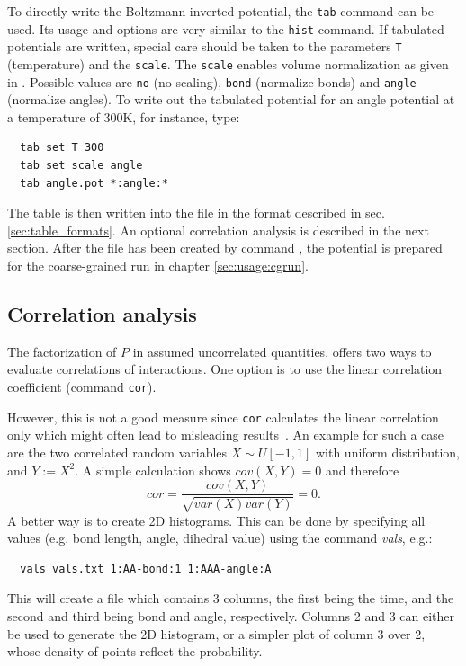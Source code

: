 To directly write the Boltzmann-inverted potential, the \texttt{tab} command can be used. Its usage and options are very similar to the \texttt{hist} command. If tabulated potentials are written, special care should be taken to the parameters \texttt{T} (temperature) and the \texttt{scale}. The \texttt{scale} enables volume normalization as given in . Possible values are \texttt{no} (no scaling), \texttt{bond} (normalize bonds) and \texttt{angle} (normalize angles). To write out the tabulated potential for an angle potential at a temperature of 300K, for instance, type:
\begin{verbatim}
  tab set T 300
  tab set scale angle
  tab angle.pot *:angle:*
\end{verbatim}
The table is then written into the file  in the format described in sec. \ref{sec:table_formats}. An optional correlation analysis is described in the next section. After the file has been created by command , the potential is prepared for the coarse-grained run in chapter \ref{sec:usage:cgrun}.

\subsection{Correlation analysis}
The factorization of $P$ in  assumed uncorrelated quantities.  offers two ways to evaluate correlations of interactions. One option is to use the linear correlation coefficient (command \texttt{cor}).

However, this is not a good measure since \texttt{cor} calculates the linear correlation only which might often lead to misleading results~\cite{Ruehle:2009.a}. An example for such a case are the two correlated random variables $X \sim U[-1,1]$ with uniform distribution, and $Y:=X^2$. A simple calculation shows $cov(X,Y)=0$ and therefore
$$cor=\frac{cov(X,Y)}{\sqrt{var(X)var(Y)}}=0.$$
A better way is to create 2D histograms. This can be done by specifying all values (e.g. bond length, angle, dihedral value) using the command \textit{vals}, e.g.:
\begin{verbatim}
  vals vals.txt 1:AA-bond:1 1:AAA-angle:A
\end{verbatim}
This will create a file which contains 3 columns, the first being the time, and the second and third being bond and angle, respectively. Columns 2 and 3 can either be used to generate the 2D histogram, or a simpler plot of column 3 over 2, whose density of points reflect the probability.

